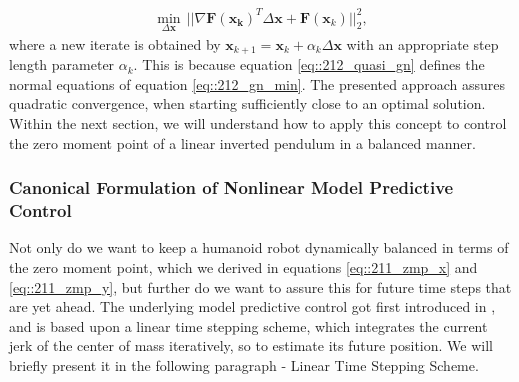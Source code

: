 \begin{align}
	\min_{\Delta\bm{x}}\,||\nabla\bm{F}(\bm{x_k})^T\Delta\bm{x}+\bm{F}(\bm{x}_k)||^2_2,
	\label{eq::212_gn_min}
\end{align}
where a new iterate is obtained by $\bm{x}_{k+1}=\bm{x}_k + \alpha_k\Delta \bm{x}$ with an appropriate step length parameter $\alpha_k$. This is because equation \ref{eq::212_quasi_gn} defines the normal equations of equation \ref{eq::212_gn_min}. The presented approach assures quadratic convergence, when starting sufficiently close to an optimal solution. Within the next section, we will understand how to apply this concept to control the zero moment point of a linear inverted pendulum in a balanced manner.
\FloatBarrier
\subsubsection{Canonical Formulation of Nonlinear Model Predictive Control}
Not only do we want to keep a humanoid robot dynamically balanced in terms of the zero moment point, which we derived in equations \ref{eq::211_zmp_x} and \ref{eq::211_zmp_y}, but further do we want to assure this for future time steps that are yet ahead. The underlying model predictive control got first introduced in \cite{kajita2003biped}, and is based upon a linear time stepping scheme, which integrates the current jerk of the center of mass iteratively, so to estimate its future position. We will briefly present it in the following paragraph - Linear Time Stepping Scheme.
\FloatBarrier
